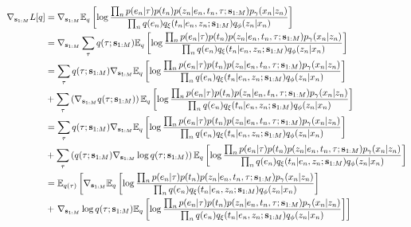 \small
\begin{equation}
    \begin{split}
    \nabla_{\inducingpoints}\L[q] &=
    \nabla_{\inducingpoints}\E_\q \left[\log \frac{\prod_\n \p(e_\n|\tree) \p(t_\n) \p(\z_\n | e_\n, t_\n, \tree; \inducingpoints)\p_\genparam(\x_\n | \z_\n)}{\prod_\n \q(e_\n)q_{\xi}(t_\n | e_\n, \z_\n; \inducingpoints)q_\recparam(\z_\n | \x_\n)}\right] \\
    &= \nabla_{\inducingpoints}\sum_{\tree} \q(\tree; \inducingpoints)\E_\q \left[\log \frac{\prod_\n \p(e_\n|\tree) \p(t_\n) \p(\z_\n | e_\n, t_\n, \tree; \inducingpoints)\p_\genparam(\x_\n | \z_\n)}{\prod_\n \q(e_\n)q_{\xi}(t_\n | e_\n, \z_\n; \inducingpoints)q_\recparam(\z_\n | \x_\n)}\right]\\
    &= \sum_\tree \q(\tree; \inducingpoints)\nabla_{\inducingpoints}\E_\q\left[\log \frac{\prod_\n \p(e_\n|\tree) \p(t_\n) \p(\z_\n | e_\n, t_\n, \tree; \inducingpoints)\p_\genparam(\x_\n | \z_\n)}{\prod_\n \q(e_\n)q_{\xi}(t_\n | e_\n, \z_\n; \inducingpoints)q_\recparam(\z_\n | \x_\n)}\right]\\
    &+ \sum_\tree \left(\nabla_{\inducingpoints} \q(\tree; \inducingpoints)\right)\E_\q \left[\log \frac{\prod_\n \p(e_\n|\tree) \p(t_\n) \p(\z_\n | e_\n, t_\n, \tree; \inducingpoints)\p_\genparam(\x_\n | \z_\n)}{\prod_\n \q(e_\n)q_{\xi}(t_\n | e_\n, \z_\n; \inducingpoints)q_\recparam(\z_\n | \x_\n)}\right]\\
    &= \sum_\tree \q(\tree; \inducingpoints)\nabla_{\inducingpoints}\E_\q\left[\log \frac{\prod_\n \p(e_\n|\tree) \p(t_\n) \p(\z_\n | e_\n, t_\n, \tree; \inducingpoints)\p_\genparam(\x_\n | \z_\n)}{\prod_\n \q(e_\n)q_{\xi}(t_\n | e_\n, \z_\n; \inducingpoints)q_\recparam(\z_\n | \x_\n)}\right]\\
    &+ \sum_\tree \left(\q(\tree;\inducingpoints)\nabla_{\inducingpoints} \log \q(\tree; \inducingpoints)\right)\E_\q \left[\log \frac{\prod_\n \p(e_\n|\tree) \p(t_\n) \p(\z_\n | e_\n, t_\n, \tree; \inducingpoints)\p_\genparam(\x_\n | \z_\n)}{\prod_\n \q(e_\n)q_{\xi}(t_\n | e_\n, \z_\n; \inducingpoints)q_\recparam(\z_\n | \x_\n)}\right]\\
    &= \E_{\q(\tree)}\left[\nabla_{\inducingpoints}\E_\q\left[\log \frac{\prod_\n \p(e_\n|\tree) \p(t_\n) \p(\z_\n | e_\n, t_\n, \tree; \inducingpoints)\p_\genparam(\x_\n | \z_\n)}{\prod_\n \q(e_\n)q_{\xi}(t_\n | e_\n, \z_\n; \inducingpoints)q_\recparam(\z_\n | \x_\n)}\right]\right.\\
    &+ \left.\nabla_{\inducingpoints} \log \q(\tree; \inducingpoints)\E_\q \left[\log \frac{\prod_\n \p(e_\n|\tree) \p(t_\n) \p(\z_\n | e_\n, t_\n, \tree; \inducingpoints)\p_\genparam(\x_\n | \z_\n)}{\prod_\n \q(e_\n)q_{\xi}(t_\n | e_\n, \z_\n; \inducingpoints)q_\recparam(\z_\n | \x_\n)}\right]\right]\\

\end{split}
\end{equation}
